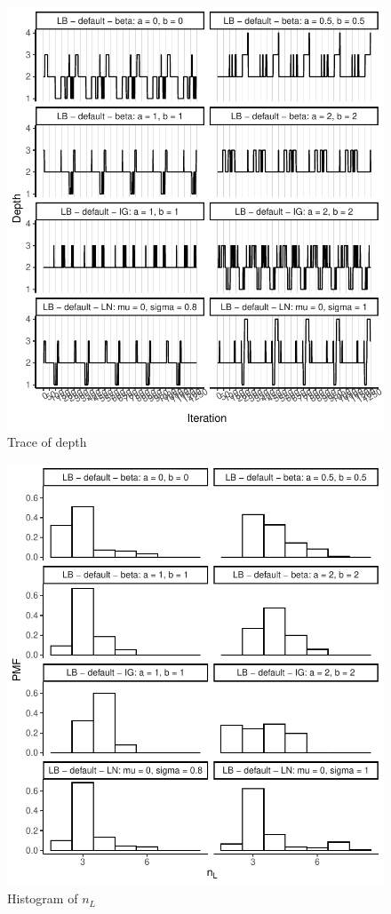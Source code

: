 \documentclass{amsart}
\begin{document}
\begin{figure}[ht]
	\centering
	\includegraphics[width=0.95\linewidth]{trace_depth_2.pdf}
	\caption{Trace of depth}
	\label{fig:trace:depth:2}
\end{figure}

\begin{figure}[ht]
	\centering
	\includegraphics[width=0.95\linewidth]{hist_nl_2.pdf}
	\caption{Histogram of $n_L$}
	\label{fig:hist:nl:2}
\end{figure}
\end{document}
